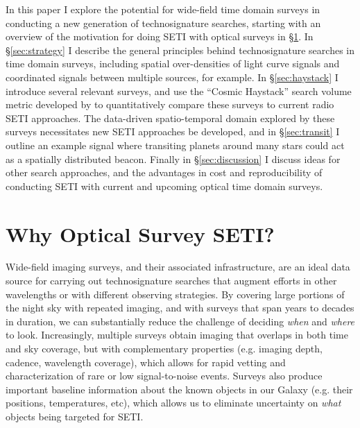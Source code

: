 \documentclass[twocolumn]{aastex62}
\begin{document}
In this paper I explore the potential for wide-field time domain surveys in conducting a new generation of technosignature searches, starting with an overview of the motivation for doing SETI with optical surveys in \S\ref{sec:method}.
In \S\ref{sec:strategy} I describe the general principles behind technosignature searches in time domain surveys, including spatial over-densities of light curve signals and coordinated signals between multiple sources, for example.
In \S\ref{sec:haystack} I introduce several relevant surveys, and use the ``Cosmic Haystack'' search volume metric developed by \citet{wright2018c} to quantitatively compare these surveys to current radio SETI approaches. 
The data-driven spatio-temporal domain explored by these surveys necessitates new SETI approaches be developed, and in \S\ref{sec:transit} I outline an example signal where transiting planets around many stars could act as a spatially distributed beacon.
Finally in \S\ref{sec:discussion} I discuss ideas for other search approaches, and the advantages in cost and reproducibility of conducting SETI with current and upcoming optical time domain surveys.




\section{Why Optical Survey SETI?}
\label{sec:method}

Wide-field imaging surveys, and their associated infrastructure, are an ideal data source for carrying out technosignature searches that augment efforts in other wavelengths or with different observing strategies. By covering large portions of the night sky with repeated imaging, and with surveys that span years to decades in duration, we can substantially reduce the challenge of deciding {\it when} and {\it where} to look. Increasingly, multiple surveys obtain imaging that overlaps in both time and sky coverage, but with complementary properties (e.g. imaging depth, cadence, wavelength coverage), which allows for rapid vetting and characterization of rare or low signal-to-noise events. Surveys also produce important baseline information about the known objects in our Galaxy (e.g. their positions, temperatures, etc), which allows us to eliminate uncertainty on {\it what} objects being targeted for SETI.
\end{document}
